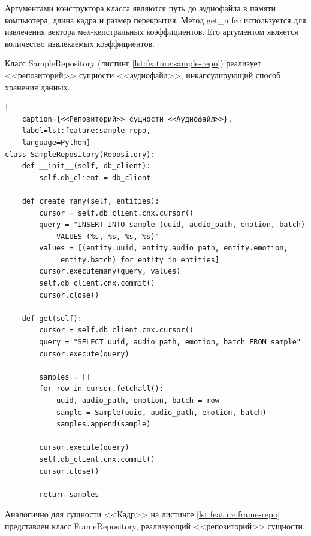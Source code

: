 Аргументами конструктора класса являются путь до аудиофайла в памяти компьютера, длина кадра и размер перекрытия. Метод get\_mfcc используется для извлечения вектора мел-кепстральных коэффициентов. Его аргументом является количество извлекаемых коэффициентов.

Класс SampleRepository (листинг \ref{lst:feature:sample-repo}) реализует <<репозиторий>> сущности <<аудиофайл>>, инкапсулирующий способ хранения данных.
\begin{lstlisting}[
	caption={<<Репозиторий>> сущности <<Аудиофайл>>},
	label=lst:feature:sample-repo,
	language=Python]
class SampleRepository(Repository):
    def __init__(self, db_client):
        self.db_client = db_client

	def create_many(self, entities):
        cursor = self.db_client.cnx.cursor()
        query = "INSERT INTO sample (uuid, audio_path, emotion, batch) 
			VALUES (%s, %s, %s, %s)"
        values = [(entity.uuid, entity.audio_path, entity.emotion,
			 entity.batch) for entity in entities]
        cursor.executemany(query, values)
        self.db_client.cnx.commit()
        cursor.close()

    def get(self):
        cursor = self.db_client.cnx.cursor()
        query = "SELECT uuid, audio_path, emotion, batch FROM sample"
        cursor.execute(query)

        samples = []
        for row in cursor.fetchall():
            uuid, audio_path, emotion, batch = row
            sample = Sample(uuid, audio_path, emotion, batch)
            samples.append(sample)

        cursor.execute(query)
        self.db_client.cnx.commit()
        cursor.close()

        return samples
\end{lstlisting}
Аналогично для сущности <<Кадр>> на листинге \ref{lst:feature:frame-repo} представлен класс FrameRepository, реализующий <<репозиторий>> сущности.
